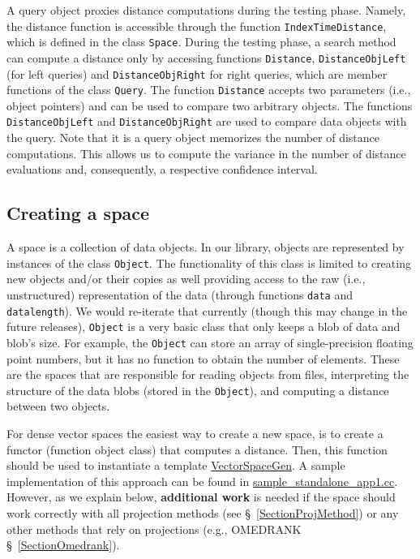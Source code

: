 \documentclass[runningheads,a4paper]{llncs}
\newcommand{\replocfile}{https://github.com/searchivarius/NonMetricSpaceLib/blob/pserv/}
\newcommand{\ttt}[1]{\texttt{#1}}
\begin{document}
A query object proxies distance computations during the testing phase.
Namely, the distance function is accessible through the function
\ttt{IndexTimeDistance}, which is defined in the class \ttt{Space}.
During the testing phase, a search method can compute a distance
only by accessing functions \ttt{Distance}, 
\ttt{DistanceObjLeft} (for left queries) and 
\ttt{DistanceObjRight} for right queries,
which are member functions of the class \ttt{Query}.
The function \ttt{Distance} accepts two parameters (i.e., object pointers) and 
can be used to compare two arbitrary objects.
The functions \ttt{DistanceObjLeft} and \ttt{DistanceObjRight} are used 
to compare data objects with the query.
Note that it is a query object  memorizes the number of distance computations.
This allows us to compute the variance in the number of distance evaluations
and, consequently, a respective confidence interval.



\subsection{Creating a space}\label{SectionCreateSpace}
A space is a collection of data objects.
In our library, objects are represented by instances
of the class \ttt{Object}.
The functionality of this class is limited to
creating new objects and/or their copies as well providing
access to the raw (i.e., unstructured) representation of the data
(through functions \ttt{data} and \ttt{datalength}).
We would re-iterate that currently (though this may change in the future releases),
\ttt{Object} is a very basic class that only keeps a blob of data and blob's size.
For example, the \ttt{Object} can store an array of single-precision floating point
numbers, but it has no function to obtain the number of elements.
These are the spaces that are responsible for reading objects from files,
interpreting the structure of the data blobs (stored in the \ttt{Object}), 
and computing a distance between two objects.

For dense vector spaces the easiest way to create a new space,
is to create a functor (function object class) that computes a distance.
Then, this function should be used to instantiate a template
\href{\replocfile similarity_search/include/space/space_vector_gen.h}{VectorSpaceGen}.
A sample implementation of this approach can be found
in \href{\replocfile sample_standalone_app/sample_standalone_app1.cc#L114}{sample\_standalone\_app1.cc}.
However, as we explain below, \textbf{additional work} is needed if the space should work correctly with all projection methods 
(see \S~\ref{SectionProjMethod}) or any other methods that rely on projections (e.g., OMEDRANK \S~\ref{SectionOmedrank}).
\end{document}
